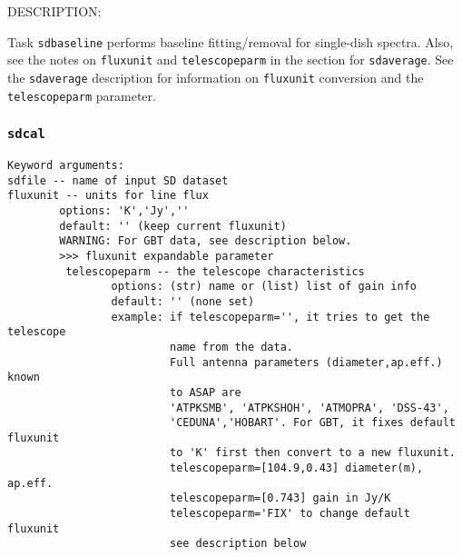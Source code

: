     DESCRIPTION:

    Task {\tt sdbaseline} performs baseline fitting/removal for single-dish spectra.
    Also, see the notes on {\tt fluxunit} and {\tt telescopeparm} in the section for
    {\tt sdaverage}.
    See the {\tt sdaverage} description for information on {\tt fluxunit} 
    conversion and the {\tt telescopeparm} parameter.


\subsubsection{{\tt sdcal}}
\label{section:sd.sdtasks.tasks.sdcal}

\begin{verbatim}
Keyword arguments:
sdfile -- name of input SD dataset
fluxunit -- units for line flux
        options: 'K','Jy',''
        default: '' (keep current fluxunit)
        WARNING: For GBT data, see description below.
        >>> fluxunit expandable parameter
         telescopeparm -- the telescope characteristics
                options: (str) name or (list) list of gain info
                default: '' (none set)
                example: if telescopeparm='', it tries to get the telescope
                         name from the data.
                         Full antenna parameters (diameter,ap.eff.) known
                         to ASAP are
                         'ATPKSMB', 'ATPKSHOH', 'ATMOPRA', 'DSS-43',
                         'CEDUNA','HOBART'. For GBT, it fixes default fluxunit
                         to 'K' first then convert to a new fluxunit.
                         telescopeparm=[104.9,0.43] diameter(m), ap.eff.
                         telescopeparm=[0.743] gain in Jy/K
                         telescopeparm='FIX' to change default fluxunit
                         see description below


\end{verbatim}

